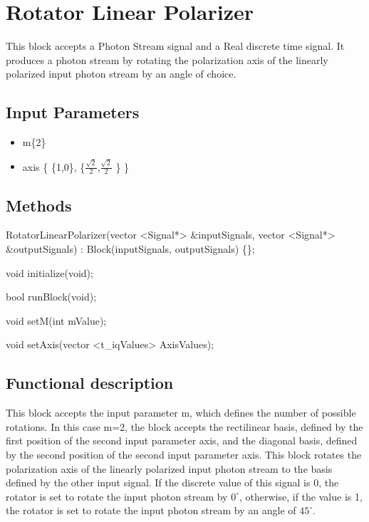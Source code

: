 \clearpage

\section{Rotator Linear Polarizer}

\maketitle
This block accepts a Photon Stream signal and a Real discrete time signal. It produces a photon stream by rotating the polarization axis of the linearly polarized input photon stream by an angle of choice.


\subsection*{Input Parameters}
    \begin{itemize}
		\item m\{2\}
		\item axis \{ \{1,0\}, \{$\frac{\sqrt{2}}{2}$,$\frac{\sqrt{2}}{2}$ \} \}
	\end{itemize}

\subsection*{Methods}

RotatorLinearPolarizer(vector <Signal*> \&inputSignals, vector <Signal*> \&outputSignals) : Block(inputSignals, outputSignals) \{\};

void initialize(void);

bool runBlock(void);

void setM(int mValue);

void setAxis(vector <t\_iqValues> AxisValues);

\subsection*{Functional description}
This block accepts the input parameter m, which defines the number of possible rotations. In this case m=2, the block accepts the rectilinear basis, defined by the first position of the second input parameter axis, and the diagonal basis, defined by the second position of the second input parameter axis.
This block rotates the polarization axis of the linearly polarized input photon stream to the basis defined by the other input signal. If the discrete value of this signal is 0, the rotator is set to rotate the input photon stream by $0^\circ$, otherwise, if the value is 1, the rotator is set to rotate the input photon stream by an angle of $45^\circ$.


